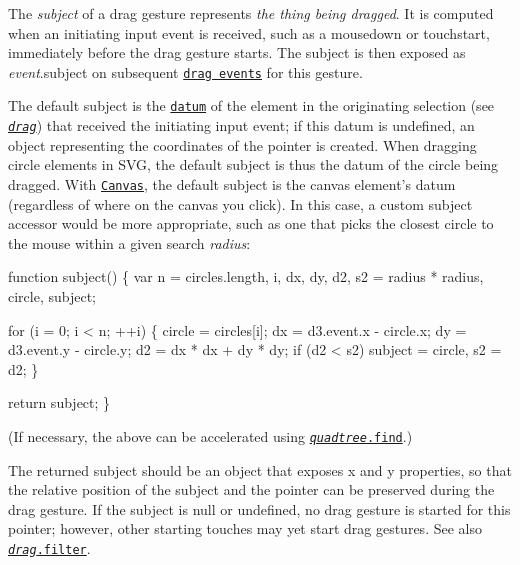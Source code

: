 The {\itshape subject} of a drag gesture represents {\itshape the thing being dragged}. It is computed when an initiating input event is received, such as a mousedown or touchstart, immediately before the drag gesture starts. The subject is then exposed as {\itshape event}.subject on subsequent \href{#drag-events}{\tt drag events} for this gesture.

The default subject is the \href{https://github.com/d3/d3-selection#selection_datum}{\tt datum} of the element in the originating selection (see \href{#_drag}{\tt {\itshape drag}}) that received the initiating input event; if this datum is undefined, an object representing the coordinates of the pointer is created. When dragging circle elements in S\+VG, the default subject is thus the datum of the circle being dragged. With \href{https://html.spec.whatwg.org/multipage/scripting.html#the-canvas-element}{\tt Canvas}, the default subject is the canvas element’s datum (regardless of where on the canvas you click). In this case, a custom subject accessor would be more appropriate, such as one that picks the closest circle to the mouse within a given search {\itshape radius}\+:


\begin{DoxyCode}
function subject() \{
  var n = circles.length,
      i,
      dx,
      dy,
      d2,
      s2 = radius * radius,
      circle,
      subject;

  for (i = 0; i < n; ++i) \{
    circle = circles[i];
    dx = d3.event.x - circle.x;
    dy = d3.event.y - circle.y;
    d2 = dx * dx + dy * dy;
    if (d2 < s2) subject = circle, s2 = d2;
  \}

  return subject;
\}
\end{DoxyCode}


(If necessary, the above can be accelerated using \href{https://github.com/d3/d3-quadtree#quadtree_find}{\tt {\itshape quadtree}.find}.)

The returned subject should be an object that exposes {\ttfamily x} and {\ttfamily y} properties, so that the relative position of the subject and the pointer can be preserved during the drag gesture. If the subject is null or undefined, no drag gesture is started for this pointer; however, other starting touches may yet start drag gestures. See also \href{#drag_filter}{\tt {\itshape drag}.filter}.


